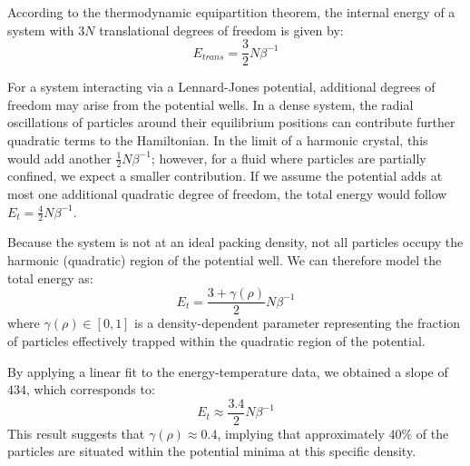 According to the thermodynamic equipartition theorem, the internal energy of a system with $3N$ translational degrees of freedom is given by:
\begin{equation}
	E_{trans} = \frac{3}{2} N \beta^{-1}
\end{equation}

For a system interacting via a Lennard-Jones potential, additional degrees of freedom may arise from the potential wells. In a dense system, the radial oscillations of particles around their equilibrium positions can contribute further quadratic terms to the Hamiltonian. In the limit of a harmonic crystal, this would add another $\frac{1}{2} N \beta^{-1}$; however, for a fluid where particles are partially confined, we expect a smaller contribution. If we assume the potential adds at most one additional quadratic degree of freedom, the total energy would follow $E_t = \frac{4}{2} N \beta^{-1}$.

Because the system is not at an ideal packing density, not all particles occupy the harmonic (quadratic) region of the potential well. We can therefore model the total energy as:
\begin{equation}
	E_t = \frac{3 + \gamma(\rho)}{2} N \beta^{-1}
\end{equation}
where $\gamma(\rho) \in [0, 1]$ is a density-dependent parameter representing the fraction of particles effectively trapped within the quadratic region of the potential.

By applying a linear fit to the energy-temperature data, we obtained a slope of $434$, which corresponds to:
\begin{equation}
	E_t \approx \frac{3.4}{2} N \beta^{-1}
\end{equation}
This result suggests that $\gamma(\rho) \approx 0.4$, implying that approximately $40\%$ of the particles are situated within the potential minima at this specific density.


